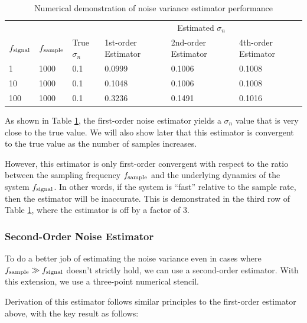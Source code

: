 \documentclass[conf]{new-aiaa}
\begin{document}
    \begin{table}[!htb]
        \centering
        \caption{Numerical demonstration of noise variance estimator performance}
        \label{tab:noise_variance_demo}
        \begin{tabular}{@{}lll|lll@{}}
            \toprule
            & & & \multicolumn{3}{c}{Estimated $\sigma_n$} \\
            $f_{\rm signal}$ & $f_{\rm sample}$ & True $\sigma_n$ & 1st-order Estimator & 2nd-order Estimator & 4th-order Estimator \\ \midrule
            1                & 1000             & 0.1             & 0.0999              & 0.1006              & 0.1008              \\
            10               & 1000             & 0.1             & 0.1048              & 0.1006              & 0.1008              \\
            100              & 1000             & 0.1             & 0.3236              & 0.1491              & 0.1016              \\ \bottomrule
        \end{tabular}
    \end{table}

    As shown in Table \ref{tab:noise_variance_demo}, the first-order noise estimator yields a $\sigma_n$ value that is very close to the true value. We will also show later that this estimator is convergent to the true value as the number of samples increases.

    However, this estimator is only first-order convergent with respect to the ratio between the sampling frequency $f_{\rm sample}$ and the underlying dynamics of the system $f_{\rm signal}$. In other words, if the system is ``fast'' relative to the sample rate, then the estimator will be inaccurate. This is demonstrated in the third row of Table \ref{tab:noise_variance_demo}, where the estimator is off by a factor of 3.

    \subsubsection{Second-Order Noise Estimator}

    To do a better job of estimating the noise variance even in cases where $f_{\rm sample} \gg f_{\rm signal}$ doesn't strictly hold, we can use a second-order estimator. With this extension, we use a three-point numerical stencil.

    Derivation of this estimator follows similar principles to the first-order estimator above, with the key result as follows:
\end{document}
